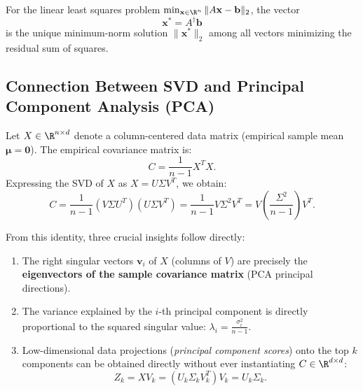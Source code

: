 \begin{property}
For the linear least squares problem $\min_{\mathbf{x} \in \R^n} \|A \mathbf{x} - \mathbf{b}\|_2$, the vector
\begin{equation}
    \mathbf{x}^* = A^\dagger \mathbf{b}
\end{equation}
is the unique minimum-norm solution $\|\mathbf{x}^*\|_2$ among all vectors minimizing the residual sum of squares.
\end{property}

\subsection{Connection Between SVD and Principal Component Analysis (PCA)}

Let $X \in \R^{n \times d}$ denote a column-centered data matrix (empirical sample mean $\boldsymbol{\mu} = \mathbf{0}$). The empirical covariance matrix is:
\begin{equation}
    C = \frac{1}{n-1} X^T X.
\end{equation}
Expressing the SVD of $X$ as $X = U \Sigma V^T$, we obtain:
\begin{equation}
    C = \frac{1}{n-1} (V \Sigma U^T) (U \Sigma V^T) = \frac{1}{n-1} V \Sigma^2 V^T = V \left( \frac{\Sigma^2}{n-1} \right) V^T.
\end{equation}

From this identity, three crucial insights follow directly:
\begin{enumerate}
    \item The right singular vectors $\mathbf{v}_i$ of $X$ (columns of $V$) are precisely the \textbf{eigenvectors of the sample covariance matrix} (PCA principal directions).
    \item The variance explained by the $i$-th principal component is directly proportional to the squared singular value: $\lambda_i = \frac{\sigma_i^2}{n-1}$.
    \item Low-dimensional data projections (\textit{principal component scores}) onto the top $k$ components can be obtained directly without ever instantiating $C \in \R^{d \times d}$:
    \begin{equation}
        Z_k = X V_k = (U_k \Sigma_k V_k^T) V_k = U_k \Sigma_k.
    \end{equation}
\end{enumerate}

